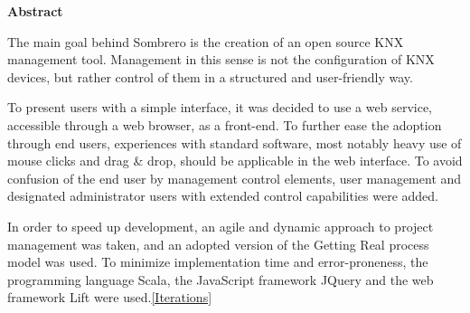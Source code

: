 \begin{flushleft}
	\Large
	\textbf{Abstract\\}
	\vspace{1.5cm}

	\large
The main goal behind Sombrero is the creation of an open source KNX management tool. Management in this sense is not the configuration of KNX devices, but rather control of them in a structured and user-friendly way.

To present users with a simple interface, it was decided to use a web service, accessible through a web browser, as a front-end. To further ease the adoption through end users, experiences with standard software, most notably heavy use of mouse clicks and drag \& drop, should be applicable in the web interface. To avoid confusion of the end user by management control elements, user management and designated administrator users with extended control capabilities were added.

In order to speed up development, an agile and dynamic approach to project management was taken, and an adopted version of the Getting Real process model was used. To minimize implementation time and error-proneness, the programming language Scala, the JavaScript framework JQuery and the web framework Lift were used.\ref{Iterations}
\end{flushleft}
